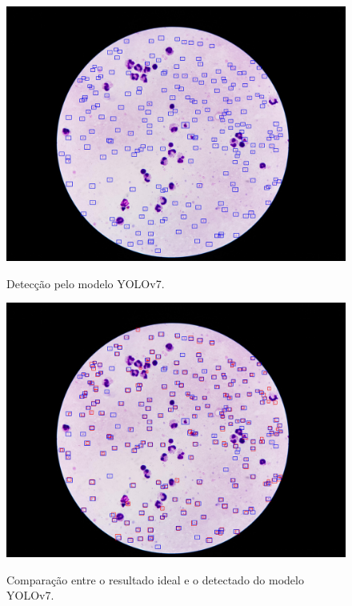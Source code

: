 \begin{frame}
    \begin{figure}[H]
	\centering
    \includegraphics[width=0.73\linewidth]{./img/results/result5-v7-detected.jpg} \\
	\caption{Detecção pelo modelo YOLOv7.} \label{img:yolov7-detected}
\end{figure}
\end{frame}

\begin{frame}
    \begin{figure}[H]
	\centering
    \includegraphics[width=0.73\linewidth]{./img/results/result5-v7.jpg} \\
	\caption{Comparação entre o resultado ideal e o detectado do modelo YOLOv7.} \label{img:yolov7}
\end{figure}
\end{frame}


